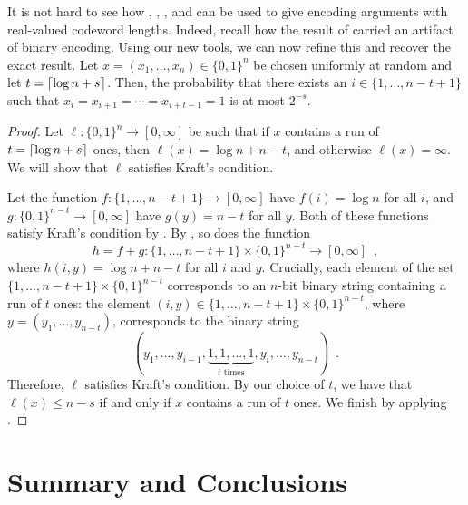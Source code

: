\documentclass{patmorin}
\newenvironment{customthm}[1]
  {\renewcommand\theinnercustomthm{#1}\innercustomthm}
  {\endinnercustomthm}
\begin{document}
It is not hard to see how , ,
, and  can be used to
give encoding arguments with real-valued codeword lengths. Indeed,
recall how the result of  carried an artifact of binary
encoding. Using our new tools, we can now refine this and recover the
exact result.
\begin{customthm}{\ref*{thm:runs-i}b}
  Let $x=(x_1,\ldots,x_n)\in\{0,1\}^n$ be chosen uniformly at random
  and let $t = {\lceil \log n + s \rceil}$. Then, the probability that there
  exists an $i\in\{1,\ldots,n-t+1\}$ such that
  $x_i=x_{i+1}=\cdots=x_{i+t-1}=1$ is at most $2^{-s}$.
\end{customthm}
\begin{proof}
  Let $\ell : \{0, 1\}^n \to [0, \infty]$ be such that if $x$ contains
  a run of $t = {\lceil \log n + s \rceil}$ ones, then
  $\ell(x) = \log n + n - t$, and otherwise $\ell(x) = \infty$. We
  will show that $\ell$ satisfies Kraft's condition.


  Let the function $f : \{1, \ldots, n - t + 1\} \to [0, \infty]$ have
  $f(i) = \log n$ for all $i$, and
  $g : \{0, 1\}^{n - t} \to [0, \infty]$ have $g(y) = n - t$ for all
  $y$. Both of these functions satisfy Kraft's condition by
  . By , so does
  the function
  \[
    h = f + g : \{1, \ldots, n - t + 1\} \times \{0, 1\}^{n - t} \to
    [0, \infty] \enspace ,
  \]
  where $h(i, y) = \log n + n - t$ for all $i$ and $y$. Crucially,
  each element of the set $\{1, \ldots, n - t + 1\} \times \{0, 1\}^{n
    - t}$ corresponds to an $n$-bit binary string containing a run of
  $t$ ones: the element $(i, y) \in \{1, \ldots, n - t + 1\} \times
  \{0, 1\}^{n - t}$, where $y = (y_1, \ldots, y_{n - t})$, corresponds
  to the binary string
  \[
  (y_1, \dots, y_{i - 1}, \underbrace{1, 1, \dots, 1}_{\text{$t$ times}},
  y_i, \dots, y_{n - t}) \enspace .
  \]
  Therefore, $\ell$ satisfies Kraft's condition. By our choice of
  $t$, we have that $\ell(x) \leq n - s$ if and only if $x$ contains a
  run of $t$ ones. We finish by applying .
\end{proof}

\section{Summary and Conclusions}
\end{document}
